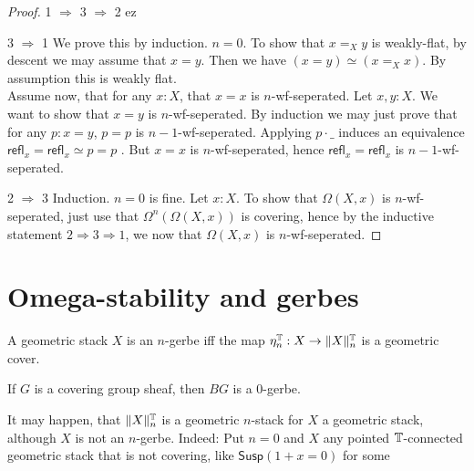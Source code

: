 \documentclass{article}
\newcommand{\refl}{\mathsf{refl}}
\newcommand{\Susp}{\mathsf{Susp}}
\begin{document}
\begin{proof}
	
	\item [1 $\Rightarrow$ 3 $\Rightarrow$ 2] ez

	\item [3 $\Rightarrow$ 1] We prove this by induction. $n = 0$. To show that $x =_{X} y$ is weakly-flat, by descent we may assume that $x = y$. Then we have $(x = y) \simeq (x =_{X} x)$. By assumption this is weakly flat. \\
	Assume now, that for any $x : X$, that $x = x$ is $n$-wf-seperated. Let $x, y : X$. We want to show that $x = y$ is $n$-wf-seperated. By induction we may just prove that for any $p : x = y$, $p = p$ is $n-1$-wf-seperated. Applying $p \cdot \_$ induces an equivalence $\refl_x = \refl_x \simeq p = p$ . But $x = x$ is $n$-wf-seperated, hence $\refl_x = \refl_x$ is $n-1$-wf-seperated.
	\item [2 $\Rightarrow$ 3] Induction. $n=0$ is fine. 
	Let $x : X$. To show that $\Omega(X,x)$ is $n$-wf-seperated, just use that $\Omega^n(\Omega(X,x))$ is covering, hence by the inductive statement $2 \Rightarrow 3 \Rightarrow 1$, we now that $\Omega(X,x)$ is $n$-wf-seperated.
\end{proof}
\section{Omega-stability and gerbes}
\begin{definition}
	A geometric stack $X$ is an $n$-gerbe iff the map $\eta_n^{\mathbb{T}} : X \to \|X\|_n^{\mathbb{T}}$ is a geometric cover.
\end{definition}
\begin{example}
	If $G$ is a covering group sheaf, then $BG$ is a 0-gerbe.
\end{example}
\begin{example}
	It may happen, that $\|X\|_n^{\mathbb{T}}$ is a geometric $n$-stack for $X$ a geometric stack, although $X$ is not an $n$-gerbe. Indeed: Put $n = 0$ and $X$ any pointed $\mathbb{T}$-connected geometric stack that is not covering, like $\Susp(1 + x = 0)$ for some 
\end{example}
\end{document}
